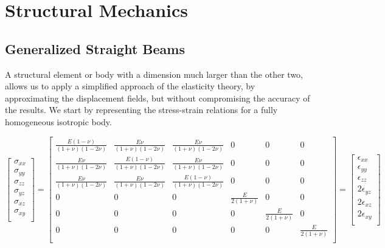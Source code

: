  \chapter{Structural Mechanics}


 \section{Generalized Straight Beams}
 A structural element or body with a dimension much larger than the other two, allows us to apply a simplified approach of the elasticity theory, by approximating the displacement fields, but without compromising the accuracy of the results.
 We start by representing the stress-strain relations for a fully homogeneous isotropic body.

 \begin{equation}
 \begin{bmatrix}
 \sigma_{xx}\\
 \sigma_{yy}\\
 \sigma_{zz}\\
 \sigma_{yz}\\
 \sigma_{xz}\\
 \sigma_{xy}\\
 \end{bmatrix}=
 \begin{bmatrix}
 \frac{E(1-\nu)}{(1+\nu)(1-2\nu)} & \frac{E\nu}{(1+\nu)(1-2\nu)} & \frac{E\nu}{(1+\nu)(1-2\nu)} & 0& 0&0\\[1mm]
 \frac{E\nu}{(1+\nu)(1-2\nu)} & \frac{E(1-\nu)}{(1+\nu)(1-2\nu)} & \frac{E\nu}{(1+\nu)(1-2\nu)} & 0& 0&0\\[1mm]
 \frac{E\nu}{(1+\nu)(1-2\nu)} & \frac{E\nu}{(1+\nu)(1-2\nu)} & \frac{E(1-\nu)}{(1+\nu)(1-2\nu)} & 0& 0&0\\[1mm]
 0 & 0 & 0 & \frac{E}{2(1+\nu)}  & 0 &0 \\[1mm]
 0 & 0 & 0 & 0  & \frac{E}{2(1+\nu)} &0 \\[1mm]
 0 & 0 & 0 & 0  & 0 &\frac{E}{2(1+\nu)} \\[1mm]
 \end{bmatrix}=
 \begin{bmatrix}
 \epsilon_{xx}\\
 \epsilon_{yy}\\
 \epsilon_{zz}\\
 2\epsilon_{yz}\\
 2\epsilon_{xz}\\
 2\epsilon_{xy}\\
 \end{bmatrix}
 \label{elastic_isotropy}
 \end{equation}


